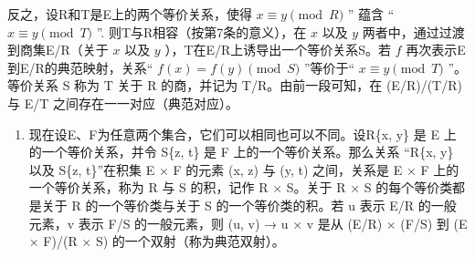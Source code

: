 反之，设R和T是E上的两个等价关系，使得 \(x \equiv y \pmod{R}\) '' 蕴含 `` \(x \equiv y \pmod{T}\) ''. 则T与R相容（按第7条的意义），在 \(x\) 以及 \(y\) 两者中，通过过渡到商集E/R（关于 \(x\) 以及 \(y\) ），T在E/R上诱导出一个等价关系S。若 \(f\) 再次表示E到E/R的典范映射，关系“ \(f(x) = f(y) \pmod{S}\) ”等价于“ \(x \equiv y \pmod{T}\) ''。等价关系 S 称为 T 关于 R 的商，并记为 T/R。由前一段可知，在 (E/R)/(T/R) 与 E/T 之间存在一一对应（典范对应）。

\begin{enumerate}
\def\labelenumi{\arabic{enumi}.}
\setcounter{enumi}{9}
\tightlist
\item
  现在设E、F为任意两个集合，它们可以相同也可以不同。设R\{x, y\} 是 E 上的一个等价关系，并令 S\{z, t\} 是 F 上的一个等价关系。那么关系 “R\{x, y\} 以及 S\{z, t\}''在积集 E × F 的元素 (x, z) 与 (y, t) 之间，关系是 E × F 上的一个等价关系，称为 R 与 S 的积，记作 R × S。关于 R × S 的每个等价类都是关于 R 的一个等价类与关于 S 的一个等价类的积。若 u 表示 E/R 的一般元素，v 表示 F/S 的一般元素，则 (u, v) → u × v 是从 (E/R) × (F/S) 到 (E × F)/(R × S) 的一个双射（称为典范双射）。
\end{enumerate}


